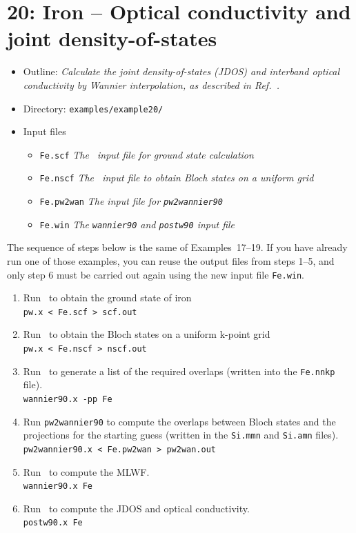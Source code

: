 \documentclass[a4paper,11pt,twoside]{article}
\begin{document}
\cleardoublepage

\section*{20: Iron -- Optical conductivity and joint density-of-states}

\begin{itemize}
\item{Outline: \it{Calculate the joint density-of-states (JDOS) and
      interband optical conductivity by Wannier interpolation, as
      described in Ref.~\cite{WanInt}.}}
\item{Directory: {\tt examples/example20/}}
\item{Input files}
\begin{itemize}
\item{ {\tt Fe.scf} {\it The \pwscf\ input file for ground state
    calculation}}
\item{ {\tt Fe.nscf}  {\it The \pwscf\ input file to obtain Bloch
    states on a uniform grid}} 
\item{ {\tt Fe.pw2wan}  {\it The input file for {\tt pw2wannier90}}}
\item{ {\tt Fe.win}  {\it The {\tt wannier90} and {\tt postw90} input file}}
\end{itemize}
\end{itemize}

The sequence of steps below is the same of Examples~17--19.  If you
have already run one of those examples, you can reuse the output files
from steps 1--5, and only step 6 must be carried out again using the
new input file {\tt Fe.win}.

\begin{enumerate}
\item Run \pwscf\ to obtain the ground state of iron\\
{\tt pw.x < Fe.scf > scf.out}

\item Run \pwscf\ to obtain the Bloch states on a uniform k-point
  grid\\ 
{\tt pw.x < Fe.nscf > nscf.out}

\item Run \wannier\ to generate a list of the required overlaps (written
  into the {\tt Fe.nnkp} file).\\
{\tt wannier90.x -pp Fe}

\item Run {\tt pw2wannier90} to compute the overlaps between Bloch
  states and the projections for the starting guess (written in the
  {\tt Si.mmn} and {\tt  Si.amn} files).\\
{\tt pw2wannier90.x < Fe.pw2wan > pw2wan.out}

\item Run \wannier\ to compute the MLWF.\\
{\tt wannier90.x Fe}

\item Run \postw\ to compute the JDOS and optical conductivity.\\
{\tt postw90.x Fe}

\end{enumerate}
\end{document}
